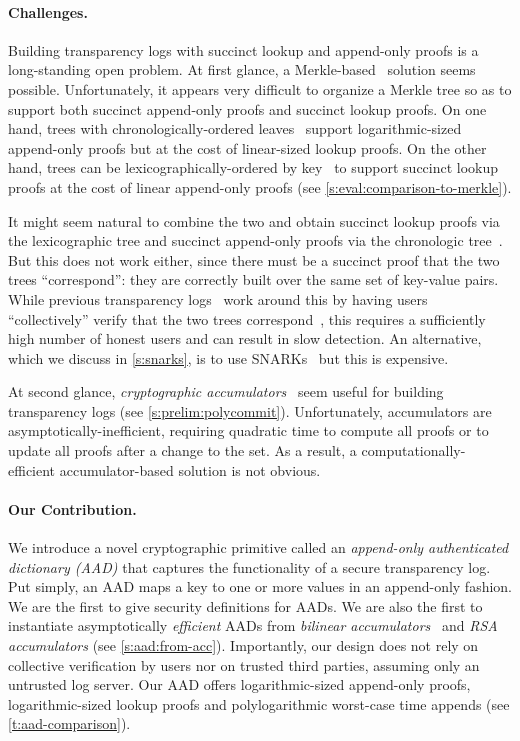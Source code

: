 \paragraph{Challenges.}
Building transparency logs with succinct lookup and append-only proofs is a long-standing open problem.
At first glance, a Merkle-based~\cite{merkle} solution seems possible.
Unfortunately, it appears very difficult to organize a Merkle tree so as to support both succinct append-only proofs and succinct lookup proofs.
On one hand, trees with chronologically-ordered leaves~\cite{versum,ht,append-only-skiplists} support logarithmic-sized append-only proofs but at the cost of linear-sized lookup proofs.
On the other hand, trees can be lexicographically-ordered by key~\cite{pads,ad,apad-oprea,BuldasLaudLipmaa2000} to support succinct lookup proofs at the cost of linear append-only proofs (see \cref{s:eval:comparison-to-merkle}).

It might seem natural to combine the two and obtain succinct lookup proofs via the lexicographic tree and succinct append-only proofs via the chronologic tree~\cite{Ryan2014}.
But this does not work either, since there must be a succinct proof that the two trees ``correspond'': they are correctly built over the same set of key-value pairs.
While previous transparency logs~\cite{Ryan2014,dtki} work around this by having users ``collectively'' verify that the two trees correspond~\cite{Ryan2014,dtki,vkd}, this requires a sufficiently high number of honest users and can result in slow detection.
An alternative, which we discuss in \cref{s:snarks}, is to use SNARKs~\cite{qsp,groth16} but this is expensive.

At second glance, \textit{cryptographic accumulators}~\cite{acc-rsa,Nguyen05} seem useful for building transparency logs (see \cref{s:prelim:polycommit}).
Unfortunately, accumulators are asymptotically-inefficient, requiring quadratic time to compute all proofs or to update all proofs after a change to the set.
As a result, a computationally-efficient accumulator-based solution is not obvious.

\paragraph{Our Contribution.}
We introduce a novel cryptographic primitive called an \textit{append-only authenticated dictionary (AAD)} that captures the functionality of a secure transparency log.
Put simply, an AAD maps a key to one or more values in an append-only fashion.
We are the first to give security definitions for AADs.
We are also the first to instantiate asymptotically \textit{efficient} AADs from \textit{bilinear accumulators}~\cite{Nguyen05} and \textit{RSA accumulators} (see \cref{s:aad:from-acc}).
Importantly, our design does not rely on collective verification by users nor on trusted third parties, assuming only an untrusted log server.
Our AAD offers logarithmic-sized append-only proofs, logarithmic-sized lookup proofs and polylogarithmic worst-case time appends (see \cref{t:aad-comparison}).

